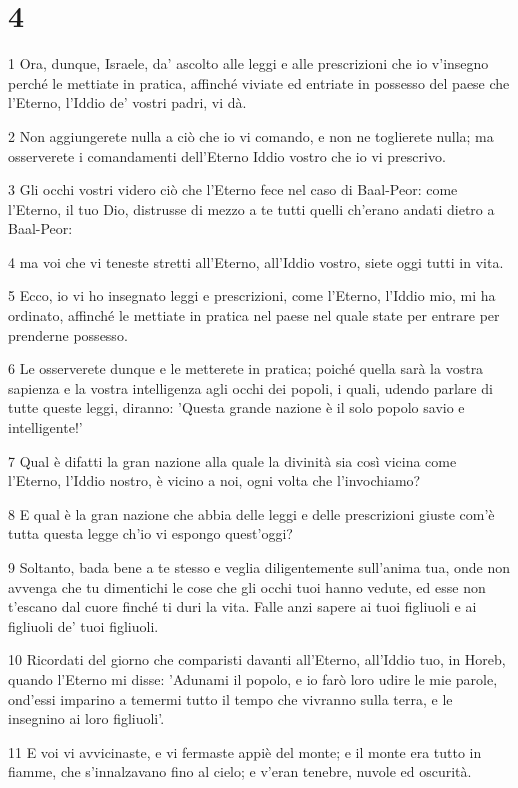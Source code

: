 \chapter{4}

\par 1 Ora, dunque, Israele, da' ascolto alle leggi e alle prescrizioni che io v'insegno perché le mettiate in pratica, affinché viviate ed entriate in possesso del paese che l'Eterno, l'Iddio de' vostri padri, vi dà.
\par 2 Non aggiungerete nulla a ciò che io vi comando, e non ne toglierete nulla; ma osserverete i comandamenti dell'Eterno Iddio vostro che io vi prescrivo.
\par 3 Gli occhi vostri videro ciò che l'Eterno fece nel caso di Baal-Peor: come l'Eterno, il tuo Dio, distrusse di mezzo a te tutti quelli ch'erano andati dietro a Baal-Peor:
\par 4 ma voi che vi teneste stretti all'Eterno, all'Iddio vostro, siete oggi tutti in vita.
\par 5 Ecco, io vi ho insegnato leggi e prescrizioni, come l'Eterno, l'Iddio mio, mi ha ordinato, affinché le mettiate in pratica nel paese nel quale state per entrare per prenderne possesso.
\par 6 Le osserverete dunque e le metterete in pratica; poiché quella sarà la vostra sapienza e la vostra intelligenza agli occhi dei popoli, i quali, udendo parlare di tutte queste leggi, diranno: 'Questa grande nazione è il solo popolo savio e intelligente!'
\par 7 Qual è difatti la gran nazione alla quale la divinità sia così vicina come l'Eterno, l'Iddio nostro, è vicino a noi, ogni volta che l'invochiamo?
\par 8 E qual è la gran nazione che abbia delle leggi e delle prescrizioni giuste com'è tutta questa legge ch'io vi espongo quest'oggi?
\par 9 Soltanto, bada bene a te stesso e veglia diligentemente sull'anima tua, onde non avvenga che tu dimentichi le cose che gli occhi tuoi hanno vedute, ed esse non t'escano dal cuore finché ti duri la vita. Falle anzi sapere ai tuoi figliuoli e ai figliuoli de' tuoi figliuoli.
\par 10 Ricordati del giorno che comparisti davanti all'Eterno, all'Iddio tuo, in Horeb, quando l'Eterno mi disse: 'Adunami il popolo, e io farò loro udire le mie parole, ond'essi imparino a temermi tutto il tempo che vivranno sulla terra, e le insegnino ai loro figliuoli'.
\par 11 E voi vi avvicinaste, e vi fermaste appiè del monte; e il monte era tutto in fiamme, che s'innalzavano fino al cielo; e v'eran tenebre, nuvole ed oscurità.
